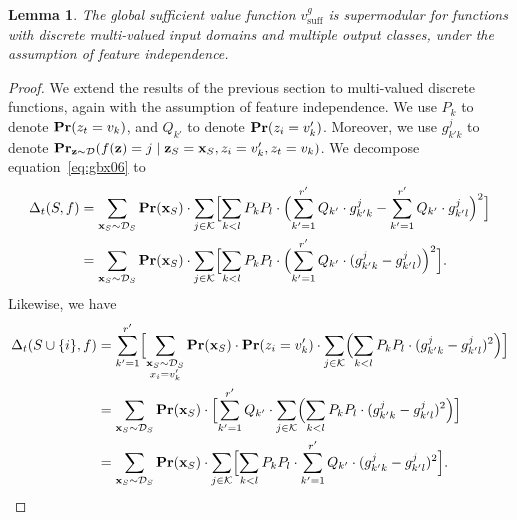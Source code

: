 \documentclass{article}
\newtheorem{lemma}{Lemma}
\newcommand{\z}{\textbf{z}}
\newcommand{\x}{\textbf{x}}
\newcommand{\fml}[1]{{\mathcal{#1}}}
\newcommand{\mbf}[1]{\ensuremath\mathbf{#1}}
\begin{document}
\begin{lemma} \label{lem:mfid}
The global sufficient value function $v^g_{\text{suff}}$
is supermodular for functions with discrete multi-valued input domains 
and multiple output classes, under the assumption of feature independence.
\end{lemma}
%
\begin{proof}
We extend the results of the previous section to multi-valued discrete functions, 
again with the assumption of feature independence.
%
We use $P_{k}$ to denote $\mbf{Pr}(z_t = v_k)$, and $Q_{k'}$ to denote $\mbf{Pr}(z_i = v_k')$.
Moreover, we use $g_{k'k}^{j}$ to denote $\mbf{Pr}_{\z\sim \mathcal{D}}(f(\z) = j \mid \z_{S} = \x_{S}, z_i = v_k', z_t = v_k)$.
We decompose equation~\ref{eq:gbx06} to
%
\begin{equation}
\begin{aligned}
\Delta_{t}(S,f)
&= \sum_{\x_{S}\sim \fml{D}_{S}} \mbf{Pr}(\x_{S}) \cdot \sum_{j \in \fml{K}} 
\Bigl[\sum_{k < l} P_{k} P_{l} \cdot \Bigl(\sum_{k' = 1}^{r'} Q_{k'} \cdot g_{k'k}^{j} - \sum_{k' = 1}^{r'} Q_{k'} \cdot g_{k'l}^{j}\Bigr)^2\Bigr] \\
&= \sum_{\x_{S}\sim \fml{D}_{S}} \mbf{Pr}(\x_{S}) \cdot \sum_{j \in \fml{K}} 
\Bigl[\sum_{k < l} P_{k} P_{l} \cdot \Bigl(\sum_{k' = 1}^{r'} Q_{k'} \cdot (g_{k'k}^{j} - g_{k'l}^{j}) \Bigr)^2\Bigr].
\end{aligned}
\end{equation}
%
Likewise, we have
%
\begin{equation}
\begin{aligned}
\Delta_{t}(S\cup\{i\},f)
&= \sum_{k' = 1}^{r'} \Bigl[ \sum_{\substack{\x_{S}\sim \fml{D}_{S} \\ x_i = v_k'}} \mbf{Pr}(\x_{S}) \cdot \mbf{Pr}(z_i = v_k') \cdot \sum_{j \in \fml{K}} 
\Bigl(\sum_{k < l} P_{k} P_{l} \cdot (g_{k'k}^{j} - g_{k'l}^{j})^2\Bigr) \Bigr] \\
&= \sum_{\x_{S}\sim \fml{D}_{S}} \mbf{Pr}(\x_{S}) \cdot \Bigl[ \sum_{k' = 1}^{r'} Q_{k'} \cdot \sum_{j \in \fml{K}} 
\Bigl(\sum_{k < l} P_{k} P_{l} \cdot (g_{k'k}^{j} - g_{k'l}^{j})^2\Bigr) \Bigr] \\
%
&= \sum_{\x_{S}\sim \fml{D}_{S}} \mbf{Pr}(\x_{S}) \cdot \sum_{j \in \fml{K}} 
\Bigl[\sum_{k < l} P_{k} P_{l} \cdot \sum_{k' = 1}^{r'} Q_{k'} \cdot (g_{k'k}^{j} - g_{k'l}^{j})^2\Bigr].

\end{aligned}
\end{equation}
\end{proof}
\end{document}
